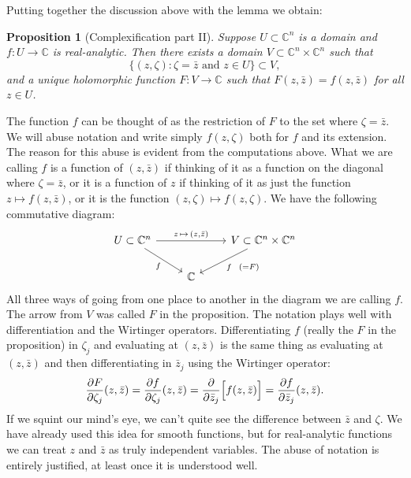 \documentclass[12pt,openany]{book}
\newcommand{\C}{{\mathbb{C}}}
\theoremstyle{plain}
\newtheorem{prop}[thm]{Proposition}
\theoremstyle{remark}
\theoremstyle{definition}
\theoremstyle{exercise}
\theoremstyle{example}
\begin{document}
Putting together the discussion above with the lemma we obtain:

\begin{prop}[Complexification part II] \label{prop:complexificationpt2}
Suppose $U \subset \C^n$ is a domain and $f \colon U \to \C$ is
real-analytic.
Then there exists a domain $V \subset \C^n \times \C^n$ such that
\begin{equation*}
\bigl\{ (z,\zeta) : \zeta = \bar{z} \text{ and } z \in U \bigr\} \subset V ,
\end{equation*}
and a unique holomorphic function $F \colon V \to \C$ such that
$F(z,\bar{z}) = f(z,\bar{z})$ for all $z \in U$.
\end{prop}

The function $f$ can be thought of as the restriction of $F$ to the set
where $\zeta = \bar{z}$.  We will abuse notation and write
simply $f(z,\zeta)$ both for $f$ and its extension.
The reason for this abuse is evident from the computations above.
What we are calling $f$ is a function of $(z,\bar{z})$ if thinking
of it as a function on the diagonal where $\zeta=\bar{z}$, or it is a function of
$z$ if thinking of it as just the function $z \mapsto f(z,\bar{z})$, or
it is the function $(z,\zeta) \mapsto f(z,\zeta)$.  We have the
following commutative diagram:
\begin{equation*}
\begin{tikzcd}
U \subset \C^n \ar[rr, "{z \, \mapsto \, (z,\bar{z})}"] \ar[dr, "f"']
&
&
V \subset \C^n \times \C^n \ar[dl, "f ~~ {(=F)}"]
\\
&
\C
\end{tikzcd}
\end{equation*}
All three ways of going from one place to another in the diagram
we are calling $f$.  The arrow from $V$ was called $F$ in the proposition.
The notation plays well with differentiation and the Wirtinger operators.
Differentiating $f$ (really the $F$ in the proposition) in $\zeta_j$ and
evaluating at $(z,\bar{z})$ is the same thing as evaluating at
$(z,\bar{z})$ and then differentiating in $\bar{z}_j$ using the Wirtinger
operator:
\begin{equation*}
\frac{\partial F}{\partial \zeta_j}(z,\bar{z}) = 
\frac{\partial f}{\partial \zeta_j}(z,\bar{z}) = 
\frac{\partial}{\partial \bar{z}_j}\Bigl[ f(z,\bar{z}) \Bigr] = 
\frac{\partial f}{\partial \bar{z}_j}(z,\bar{z}) .
\end{equation*}
If we squint our mind's eye,
we can't quite see the difference between $\bar{z}$ and $\zeta$.
We have already used this idea for smooth functions, but for
real-analytic functions we can 
treat $z$ and $\bar{z}$ as truly independent variables.
The abuse of notation is entirely justified, at least once it is
understood well.
\end{document}
